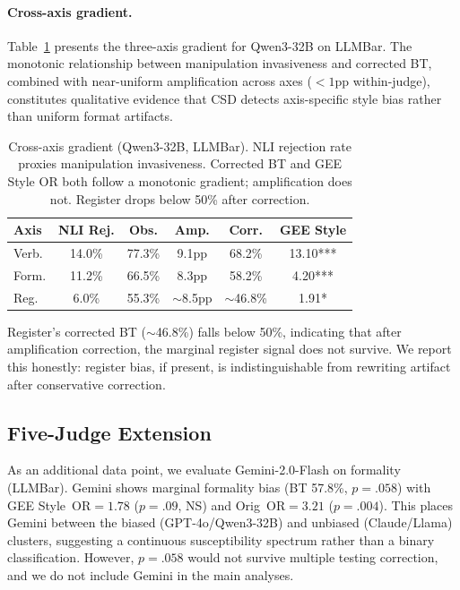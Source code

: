 \documentclass[11pt]{article}
\begin{document}
\paragraph{Cross-axis gradient.} Table~\ref{tab:gradient} presents the three-axis gradient for Qwen3-32B on LLMBar. The monotonic relationship between manipulation invasiveness and corrected BT, combined with near-uniform amplification across axes ($<1$pp within-judge), constitutes qualitative evidence that CSD detects axis-specific style bias rather than uniform format artifacts.

\begin{table}[t]
\centering
\small
\begin{tabular}{lccccc}
\toprule
\textbf{Axis} & \textbf{NLI Rej.} & \textbf{Obs.} & \textbf{Amp.} & \textbf{Corr.} & \textbf{GEE Style} \\
\midrule
Verb. & 14.0\% & 77.3\% & 9.1pp & 68.2\% & 13.10*** \\
Form. & 11.2\% & 66.5\% & 8.3pp & 58.2\% & 4.20*** \\
Reg. & 6.0\% & 55.3\% & $\sim$8.5pp & $\sim$46.8\% & 1.91* \\
\bottomrule
\end{tabular}
\caption{Cross-axis gradient (Qwen3-32B, LLMBar). NLI rejection rate proxies manipulation invasiveness. Corrected BT and GEE Style OR both follow a monotonic gradient; amplification does not. Register drops below 50\% after correction.}
\label{tab:gradient}
\end{table}

Register's corrected BT ($\sim$46.8\%) falls below 50\%, indicating that after amplification correction, the marginal register signal does not survive. We report this honestly: register bias, if present, is indistinguishable from rewriting artifact after conservative correction.

\subsection{Five-Judge Extension}
\label{app:gemini}

As an additional data point, we evaluate Gemini-2.0-Flash on formality (LLMBar). Gemini shows marginal formality bias (BT 57.8\%, $p=.058$) with GEE Style~OR$=1.78$ ($p=.09$, NS) and Orig~OR$=3.21$ ($p=.004$). This places Gemini between the biased (GPT-4o/Qwen3-32B) and unbiased (Claude/Llama) clusters, suggesting a continuous susceptibility spectrum rather than a binary classification. However, $p=.058$ would not survive multiple testing correction, and we do not include Gemini in the main analyses.
\end{document}
